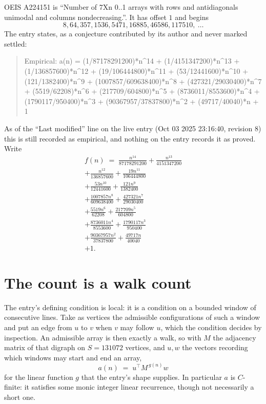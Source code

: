 \documentclass[11pt,a4paper]{article}
\theoremstyle{plain}
\theoremstyle{definition}
\begin{document}
OEIS A224151 is ``Number of 7Xn 0..1 arrays with rows and antidiagonals unimodal and columns nondecreasing.''. It has offset $1$ and begins
\[
8, 64, 357, 1536, 5471, 16885, 46586, 117510,\ \dots
\]
The entry states, as a conjecture contributed by its author and never marked settled:
\begin{quote}
Empirical: a(n) = (1/87178291200)*n\^{}14 + (1/4151347200)*n\^{}13 + (1/136857600)*n\^{}12 + (19/106444800)*n\^{}11 + (53/12441600)*n\^{}10 + (121/1382400)*n\^{}9 + (1007857/609638400)*n\^{}8 + (427321/29030400)*n\^{}7 + (5519/62208)*n\^{}6 + (217709/604800)*n\^{}5 + (8736011/8553600)*n\^{}4 + (1790117/950400)*n\^{}3 + (90367957/37837800)*n\^{}2 + (49717/40040)*n + 1
\end{quote}
As of the ``Last modified'' line on the live entry (Oct 03 2025 23:16:40, revision 8) this is still
recorded as empirical, and nothing on the entry records it as proved. Write
\begin{multline*}
f(n)\;=\;\frac{n^{14}}{87178291200} + \frac{n^{13}}{4151347200} \\
+ \frac{n^{12}}{136857600} + \frac{19 n^{11}}{106444800} \\
+ \frac{53 n^{10}}{12441600} + \frac{121 n^{9}}{1382400} \\
+ \frac{1007857 n^{8}}{609638400} + \frac{427321 n^{7}}{29030400} \\
+ \frac{5519 n^{6}}{62208} + \frac{217709 n^{5}}{604800} \\
+ \frac{8736011 n^{4}}{8553600} + \frac{1790117 n^{3}}{950400} \\
+ \frac{90367957 n^{2}}{37837800} + \frac{49717 n}{40040} \\
+ 1.
\end{multline*}

\section{The count is a walk count}

The entry's defining condition is local: it is a condition on a bounded window of consecutive lines. Take as vertices the
admissible configurations of such a window and put an edge from $u$ to $v$ when $v$ may
follow $u$, which the condition decides by inspection. An admissible array is then exactly a
walk, so with $M$ the adjacency matrix of that digraph on $S=131072$ vertices, and $u,w$ the
vectors recording which windows may start and end an array,
\[
a(n)\;=\;u^{\!\top}M^{\,g(n)}w
\]
for the linear function $g$ that the entry's shape supplies. In particular $a$ is
$C$-finite: it satisfies some monic integer linear recurrence, though not necessarily a short
one.
\end{document}
